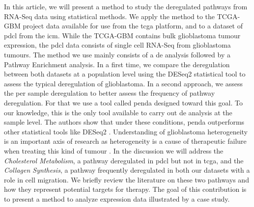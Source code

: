 In this article, we will present a method to study the deregulated pathways from RNA-Seq data using statistical methods.
We apply the method to the TCGA-GBM project data available for use from the \acrfull{tcga} platform, and to a dataset of \acrfull{pdcl} from the \acrfull{icm}.
While the TCGA-GBM contains bulk glioblastoma tumour expression, the \acrshort{pdcl} data consists of single cell RNA-Seq from glioblastoma tumours.
The method we use mainly consists of a \acrfull{de} analysis followed by a Pathway Enrichment analysis.
In a first time, we compare the deregulation between both datasets at a population level using the DESeq2 statistical tool to assess the typical deregulation of glioblastoma.
In a second approach, we assess the per sample deregulation to better assess the frequency of pathway deregulation. For that we use a tool called \acrfull{penda} designed toward this goal.
To our knowledge, this is the only tool available to carry out \acrlong{de} analysis at the sample level.
The authors show that under these conditions, \acrshort{penda} outperforms other statistical tools like DESeq2 \cite*{Richard2020}.
Understanding of glioblastoma heterogeneity is an important axis of research as heterogeneity is a cause of therapeutic failure when treating this kind of tumour \cite*{Neftel2019}.
In the discussion we will address the \textit{Cholesterol Metabolism}, a pathway deregulated in \acrshort{pdcl} but not in \acrshort{tcga}, and the \textit{Collagen Synthesis}, a pathway frequently deregulated in both our datasets with a role in cell migration.
We briefly review the literature on these two pathways and how they represent potential targets for therapy.
The goal of this contribution is to present a method to analyze expression data illustrated by a case study.